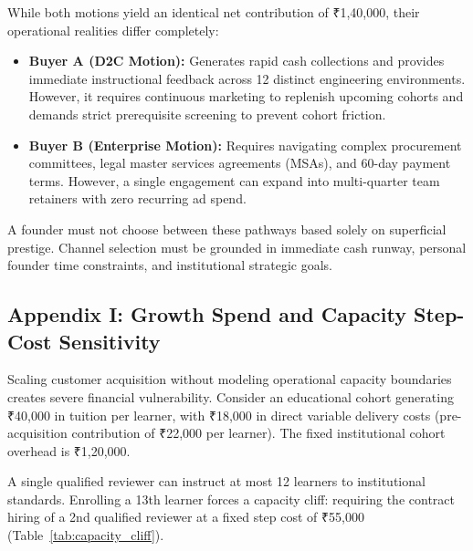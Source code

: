 While both motions yield an identical net contribution of ₹1,40,000, their operational realities differ completely:
\begin{itemize}[leftmargin=*,itemsep=1pt]
  \item \textbf{Buyer A (D2C Motion):} Generates rapid cash collections and provides immediate instructional feedback across 12 distinct engineering environments. However, it requires continuous marketing to replenish upcoming cohorts and demands strict prerequisite screening to prevent cohort friction.
  \item \textbf{Buyer B (Enterprise Motion):} Requires navigating complex procurement committees, legal master services agreements (MSAs), and 60-day payment terms. However, a single engagement can expand into multi-quarter team retainers with zero recurring ad spend.
\end{itemize}

A founder must not choose between these pathways based solely on superficial prestige. Channel selection must be grounded in immediate cash runway, personal founder time constraints, and institutional strategic goals.

\subsection*{Appendix I: Growth Spend and Capacity Step-Cost Sensitivity}

Scaling customer acquisition without modeling operational capacity boundaries creates severe financial vulnerability. Consider an educational cohort generating ₹40,000 in tuition per learner, with ₹18,000 in direct variable delivery costs (pre-acquisition contribution of ₹22,000 per learner). The fixed institutional cohort overhead is ₹1,20,000. 

A single qualified reviewer can instruct at most 12 learners to institutional standards. Enrolling a 13th learner forces a capacity cliff: requiring the contract hiring of a 2nd qualified reviewer at a fixed step cost of ₹55,000 (Table~\ref{tab:capacity_cliff}).

